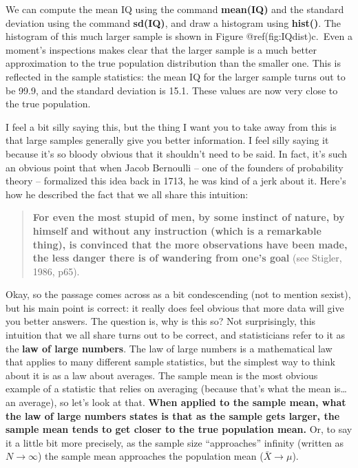 \documentclass[
  letterpaper,
  DIV=11,
  numbers=noendperiod]{scrreprt}
\begin{document}
We can compute the mean IQ using the command \textbf{mean(IQ)} and the
standard deviation using the command \textbf{sd(IQ)}, and draw a
histogram using \textbf{hist()}. The histogram of this much larger
sample is shown in Figure @ref(fig:IQdist)c.~Even a moment's inspections
makes clear that the larger sample is a much better approximation to the
true population distribution than the smaller one. This is reflected in
the sample statistics: the mean IQ for the larger sample turns out to be
99.9, and the standard deviation is 15.1. These values are now very
close to the true population.

I feel a bit silly saying this, but the thing I want you to take away
from this is that large samples generally give you better information. I
feel silly saying it because it's so bloody obvious that it shouldn't
need to be said. In fact, it's such an obvious point that when Jacob
Bernoulli -- one of the founders of probability theory -- formalized
this idea back in 1713, he was kind of a jerk about it. Here's how he
described the fact that we all share this intuition:

\begin{quote}
\textbf{For even the most stupid of men, by some instinct of nature, by
himself and without any instruction (which is a remarkable thing), is
convinced that the more observations have been made, the less danger
there is of wandering from one's goal} (see Stigler, 1986, p65).
\end{quote}

Okay, so the passage comes across as a bit condescending (not to mention
sexist), but his main point is correct: it really does feel obvious that
more data will give you better answers. The question is, why is this so?
Not surprisingly, this intuition that we all share turns out to be
correct, and statisticians refer to it as the \textbf{law of large
numbers}. The law of large numbers is a mathematical law that applies to
many different sample statistics, but the simplest way to think about it
is as a law about averages. The sample mean is the most obvious example
of a statistic that relies on averaging (because that's what the mean
is\ldots{} an average), so let's look at that. \textbf{When applied to
the sample mean, what the law of large numbers states is that as the
sample gets larger, the sample mean tends to get closer to the true
population mean.} Or, to say it a little bit more precisely, as the
sample size ``approaches'' infinity (written as
\(N \rightarrow \infty\)) the sample mean approaches the population mean
(\(\bar{X} \rightarrow \mu\)).
\end{document}
